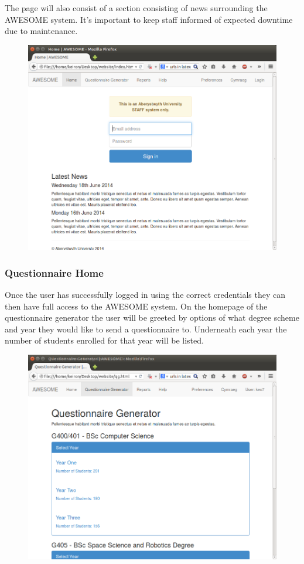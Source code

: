 \documentclass[11pt,a4paper]{article}
\begin{document}
The page will also consist of a section consisting of news surrounding the AWESOME system. It's important to keep staff informed of expected downtime due to maintenance.
\begin{figure}[h]
\centering
\includegraphics[width=0.85\linewidth]{images/uidesign/homepage.png}
\end{figure}

\clearpage

\subsubsection{Questionnaire Home}

Once the user has successfully logged in using the correct credentials they can then have full access to the AWESOME system. On the homepage of the questionnaire generator the user will be greeted by options of what degree scheme and year they would like to send a questionnaire to. Underneath each year the number of students enrolled for that year will be listed.

\begin{figure}[h]
\centering
\includegraphics[width=0.85\linewidth]{images/uidesign/questionnairehome.png}
\end{figure}
\end{document}
